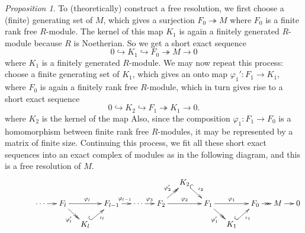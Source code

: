 \documentclass{article}
\renewcommand{\to}{\ensuremath{\rightarrow}}
\newcommand{\onto}{\ensuremath{\twoheadrightarrow}}
\newcommand{\into}{\ensuremath{\hookrightarrow}}
\theoremstyle{definition}
\theoremstyle{remark}
\theoremstyle{example}
\newtheorem{prop}{Proposition}[section]
\begin{document}
\begin{prop}
    To (theoretically) construct a free resolution, we first choose a (finite) generating set of $M$, which gives a surjection $F_0 \onto M$ where $F_0$ is a finite rank free $R$-module. The kernel of this map $K_1$ is again a finitely generated $R$-module because $R$ is Noetherian. So we get a short exact sequence 
    \begin{equation}
        0 \into K_1 \into F_0 \onto M \to 0
    \end{equation}
    where $K_1$ is a finitely generated $R$-module.  We may now repeat this process: choose a finite generating set of $K_1$, which gives an onto map $\varphi_1': F_1 \to K_1$, where $F_0$ is again a finitely rank free $R$-module, which in turn gives rise to a short exact sequence
    \begin{equation}
        0 \into K_2 \into F_1 \onto K_1 \to 0.
    \end{equation}
    where $K_2$ is the kernel of the map Also, since the composition $\varphi_1: F_1 \to F_0$ is a homomorphism between finite rank free $R$-modules, it may be represented by a matrix of finite size. Continuing this process, we fit all these short exact sequences into an exact complex of modules as in the following diagram, and this is a free resolution of $M$.
    \begin{equation}\label{eqn:16}
        \xymatrix@C=1pc@R=1pc{
            &            &       &       &       &      &       &     &K_2 \ar@{^{(}->}[dr]^{\iota_2}\\
            &       &\cdots \ar[r]       &F_{l} \ar@{->>}[dr]_{\varphi_{l}'} \ar[rr]^{\varphi_{l}}&       &F_{l-1} \ar[r]^{\varphi_{l-1}}&\cdots \ar[r]^{\varphi_3}&F_2 \ar@{->>}[ur]^{\varphi_2'} \ar[rr]^{\varphi_2}&       &F_1 \ar@{->>}[dr]_{\varphi_1'} \ar[rr]^{\varphi_1} &         &  F_0 \ar@{->>}[r] & M \ar[r] & 0\\
            &        &       &       & K_{l} \ar@{^{(}->}[ur]_{\iota_{l}}        &        &        &      &       &       & K_1 \ar@{^{(}->}[ur]_{\iota_1}  &       &       & \\
        }
\end{equation}
\end{prop}
\end{document}
